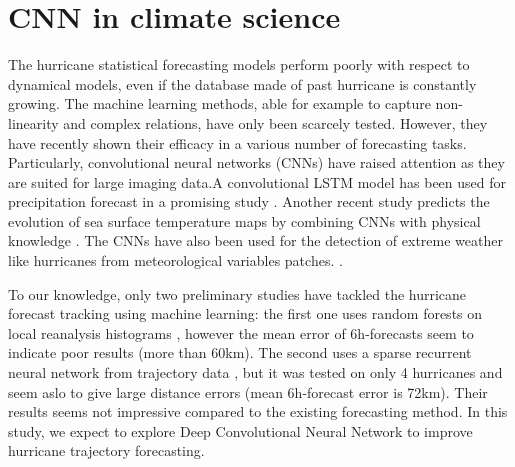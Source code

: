 \section{CNN in climate science}
The hurricane statistical forecasting models perform poorly with respect to dynamical models, even if the database made of past hurricane is constantly growing. The machine learning methods, able for example to capture non-linearity and complex relations, have only been scarcely tested. However, they have recently shown their efficacy in a various number of forecasting tasks. Particularly, convolutional neural networks (CNNs) have raised attention as they are suited for large imaging data.A convolutional LSTM model has been used for precipitation forecast in a promising study \cite{xingjian2015convolutional}. Another recent study predicts the evolution of sea surface temperature maps by combining CNNs with physical knowledge \cite{de2017deep}. The CNNs have also been used for the detection of extreme weather like hurricanes from meteorological variables patches. \cite{racah2017extremeweather}.

To our knowledge, only two preliminary studies have tackled the hurricane forecast tracking using machine learning: the first one uses random forests on local reanalysis histograms \cite{liberge2011prevision}, however the mean error of 6h-forecasts seem to indicate poor results (more than 60km). The second uses a sparse recurrent neural network from trajectory data \cite{moradi2016sparse}, but it was tested on only 4 hurricanes and seem aslo to give large distance errors (mean 6h-forecast error is 72km). Their results seems not impressive compared to the existing forecasting method. In this study, we expect to explore Deep Convolutional Neural Network to improve hurricane trajectory forecasting.



